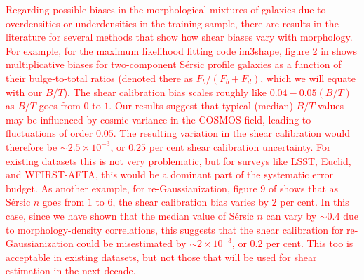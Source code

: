 \documentclass[twocolumn,useAMS,usenatbib]{mn2e}
\newcommand{\rachel}[1]{{\textcolor{red}{#1}}}
\newcommand{\sersic}{S\'{e}rsic }
\begin{document}
\rachel{Regarding possible biases in the morphological mixtures of galaxies
due to overdensities or underdensities in the training sample, there
are results in the literature for several methods that show how shear
biases vary with morphology.  For example, for the maximum likelihood
fitting code {\sc im3shape}, figure 2 in \cite{2012MNRAS.427.2711K}
shows multiplicative biases for two-component \sersic profile galaxies
as a function of their bulge-to-total ratios (denoted there as
$F_b/(F_b+F_d)$, which we will equate with our $B/T$).  The shear
calibration bias scales roughly like $0.04 - 0.05(B/T)$ as $B/T$ goes
from $0$ to $1$.  Our results suggest that typical (median) $B/T$
values may be influenced by cosmic variance in the COSMOS field,
leading to fluctuations of order $0.05$.  The resulting variation in
the shear calibration  would therefore be $\sim 2.5\times 10^{-3}$, or
$0.25$ per cent shear calibration uncertainty.  For existing datasets
this is not very problematic, but for surveys like LSST, Euclid, and
WFIRST-AFTA, this would be a dominant part of the systematic error
budget.  As another example, for re-Gaussianization, figure 9 of
\cite{2012MNRAS.420.1518M} shows that as \sersic $n$ goes from $1$ to
$6$, the shear calibration bias varies by $2$ per cent.  In this case,
since we have shown that the median value of \sersic $n$ can vary by
$\sim 0.4$ due to morphology-density correlations, this suggests that
the shear calibration for re-Gaussianization could be misestimated by
$\sim 2\times 10^{-3}$, or 0.2 per cent.  This too is acceptable in
existing datasets, but not those that will be used for shear
estimation in the next decade.}
\end{document}
